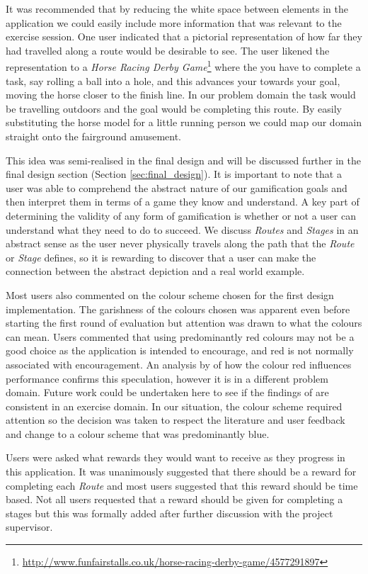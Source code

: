 It was recommended that by reducing the white space between elements
in the application we could easily include more information that was
relevant to the exercise session. One user indicated that a pictorial
representation of how far they had travelled along a route would be
desirable to see. The user likened the representation to a \emph{Horse
  Racing Derby
  Game}\footnote{\url{http://www.funfairstalls.co.uk/horse-racing-derby-game/4577291897}}
where the you have to complete a task, say rolling a ball into a hole,
and this advances your towards your goal, moving the horse closer to
the finish line. In our problem domain the task would be travelling
outdoors and the goal would be completing this route. By easily
substituting the horse model for a little running person we could map
our domain straight onto the fairground amusement. 

This idea was semi-realised in the final design and will be discussed
further in the final design section (Section
\ref{sec:final_design}). It is important to note that a user was able
to comprehend the abstract nature of our gamification goals and
then interpret them in terms of a game they know and understand. A key
part of determining the validity of any form of gamification is
whether or not a user can understand what they need to do to
succeed. We discuss \emph{Routes} and \emph{Stages} in an abstract
sense as the user never physically travels along the path that the
\emph{Route} or \emph{Stage} defines, so it is rewarding to discover
that a user can make the connection between the abstract depiction and
a real world example.

Most users also commented on the colour scheme chosen for the first
design implementation. The garishness of the colours chosen was
apparent even before starting the first round of evaluation but
attention was drawn to what the colours can mean. Users commented that
using predominantly red colours may not be a good choice as the
application is intended to encourage, and red is not normally
associated with encouragement. An analysis by \citet{colours_red}
of how the colour red influences performance confirms this
speculation, however it is in a different problem domain. Future work
could be undertaken here to see if the findings of \citet{colours_red}
are consistent in an exercise domain. In our situation, the colour
scheme required attention so the decision was taken to respect the
literature and user feedback and change to a colour scheme that was
predominantly blue.

Users were asked what rewards they would want to receive as they
progress in this application. It was unanimously suggested that there
should be a reward for completing each \emph{Route} and most users
suggested that this reward should be time based. Not all users
requested that a reward should be given for completing a stages but
this was formally added after further discussion with the project
supervisor. 

